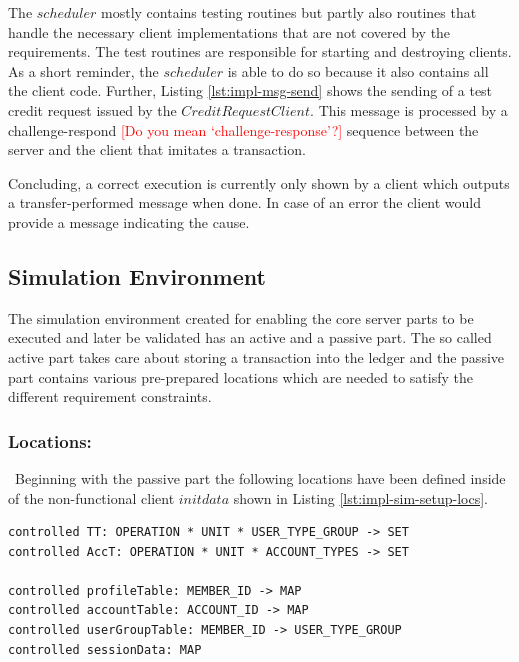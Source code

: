 The $scheduler$ mostly contains testing routines but partly also routines that handle the necessary client implementations that are not covered by the requirements. The test routines are responsible for starting and destroying clients. As a short reminder, the $scheduler$ is able to do so because it also contains all the client code. Further, Listing \ref{lst:impl-msg-send} shows the sending of a test credit request issued by the $CreditRequestClient$. This message is processed by a challenge-respond 
\textcolor{red}{[Do you mean `challenge-response'?]} sequence between the server and the client that imitates a transaction.

Concluding, a correct execution is currently only shown by a client which outputs a transfer-performed message when done. In case of an error the client would provide a message indicating the cause.

\subsection{Simulation Environment}
\label{subsec:impl-sim-env}

The simulation environment created for enabling the core server parts to be executed and later be validated has an active and a passive part. The so called active part takes care about storing a transaction into the ledger and the passive part contains various pre-prepared locations which are needed to satisfy the different requirement constraints.

\subsubsection{Locations: }\ Beginning with the passive part the following locations have been defined inside of the non-functional client $initdata$ shown in Listing \ref{lst:impl-sim-setup-locs}.

\begin{center}
\begin{minipage}{0.8\textwidth}
\small
\begin{lstlisting}[language=bsl_lst,caption={\bf\small Simulation Environment Locations},label={lst:impl-sim-setup-locs} ]
controlled TT: OPERATION * UNIT * USER_TYPE_GROUP -> SET
controlled AccT: OPERATION * UNIT * ACCOUNT_TYPES -> SET

controlled profileTable: MEMBER_ID -> MAP
controlled accountTable: ACCOUNT_ID -> MAP
controlled userGroupTable: MEMBER_ID -> USER_TYPE_GROUP
controlled sessionData: MAP
\end{lstlisting}
\end{minipage}
\end{center}

